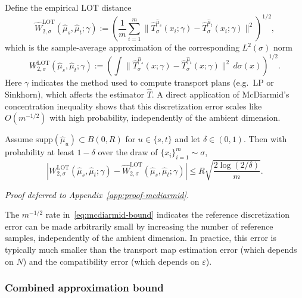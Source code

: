 \documentclass[11pt]{article}
\newcommand{\1}{\mathbf{1}}
\begin{document}
Define the empirical LOT distance
\begin{equation}\label{eq:empirical-lot}
  \widehat{W}_{2,\sigma}^{\mathrm{LOT}}(\hat{\mu}_s, \hat{\mu}_t;\gamma)
  := \left(\frac{1}{m}\sum_{i=1}^{m}
     \bigl\|\hat{T}_\sigma^{\hat{\mu}_s}(x_i;\gamma)
     - \hat{T}_\sigma^{\hat{\mu}_t}(x_i;\gamma)\bigr\|^2\right)^{1/2},
\end{equation}
which is the sample-average approximation of the corresponding $L^2(\sigma)$ norm
\[
  W_{2,\sigma}^{\mathrm{LOT}}(\hat{\mu}_s,\hat{\mu}_t;\gamma)
  := \left(\int
     \bigl\|\hat{T}_\sigma^{\hat{\mu}_s}(x;\gamma)
     - \hat{T}_\sigma^{\hat{\mu}_t}(x;\gamma)\bigr\|^2\,d\sigma(x)\right)^{1/2}.
\]
Here $\gamma$ indicates the method used to compute transport plans (e.g.\ LP or Sinkhorn), which affects the estimator $\hat T$. A direct application of McDiarmid's concentration inequality shows that this discretization error scales like $O(m^{-1/2})$ with high probability, independently of the ambient dimension. \\

\begin{proposition}\label{prop:mcdiarmid}
Assume $\mathrm{supp}(\hat{\mu}_u)\subset B(0,R)$ for $u\in\{s,t\}$ and let $\delta\in(0,1)$. Then with probability at least $1-\delta$ over the draw of $\{x_i\}_{i=1}^m \sim \sigma$,
\begin{equation}\label{eq:mcdiarmid-bound}
  \left|W_{2,\sigma}^{\mathrm{LOT}}(\hat{\mu}_s, \hat{\mu}_t;\gamma)
  - \widehat{W}_{2,\sigma}^{\mathrm{LOT}}(\hat{\mu}_s, \hat{\mu}_t;\gamma)
  \right|
  \leq R\sqrt{\frac{2\log(2/\delta)}{m}}.
\end{equation}
\end{proposition}
\noindent\emph{Proof deferred to Appendix~\ref{app:proof-mcdiarmid}.}

The $m^{-1/2}$ rate in~\eqref{eq:mcdiarmid-bound} indicates the reference discretization error can be made arbitrarily small
by increasing the number of reference samples, independently of the
ambient dimension.  In practice, this error is typically much smaller
than the transport map estimation error (which depends on $N$) and
the compatibility error (which depends on $\varepsilon$).


\subsubsection{Combined approximation bound}
\end{document}
